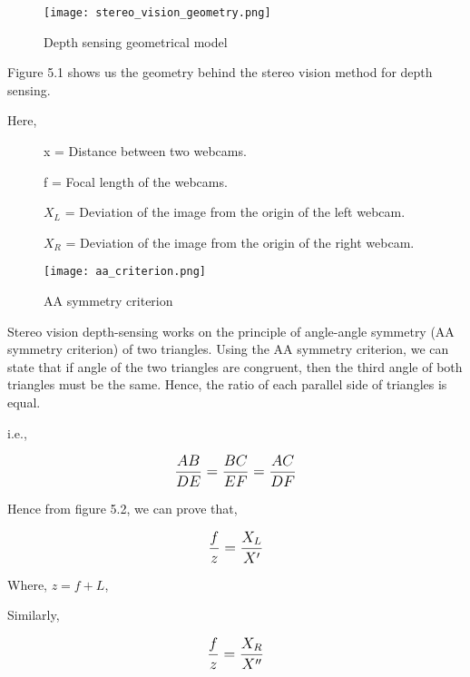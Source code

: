 \documentclass[../../hardware_design_intro/hardware_design_intro.tex]{subfiles}
\begin{document}
\FloatBarrier

\begin{figure}[ht]
    \centering
    \texttt{[image: stereo\_vision\_geometry.png]}
    \caption{Depth sensing geometrical model}
\end{figure}

\FloatBarrier

Figure 5.1 shows us the geometry behind the stereo vision method for depth sensing.

Here, 

\begin{description}
    \item[]x = Distance between two webcams. 
    \item[]f = Focal length of the webcams.
    \item[]\(X_{L}\) = Deviation of the image from the origin of the left webcam.
    \item[]\(X_{R}\) = Deviation of the image from the origin of the right webcam.  
\end{description}

\begin{figure}[ht]
    \centering
    \texttt{[image: aa\_criterion.png]}
    \caption{AA symmetry criterion}
\end{figure}

Stereo vision depth-sensing works on the principle of angle-angle symmetry (AA symmetry 
criterion) of two triangles. Using the AA symmetry criterion, we can state that if angle
of the two triangles are congruent, then the third angle of both triangles must be the 
same. Hence, the ratio of each parallel side of triangles is equal.

i.e.,

\begin{equation}
    \text{\large$ \frac{AB}{DE} = \frac{BC}{EF} = \frac{AC}{DF} $}
\end{equation}

Hence from figure 5.2, we can prove that,

\begin{equation}
    \text{\large$ \frac{f}{z} = \frac{X_{L}}{X'} $}
\end{equation}

Where, \(z = f + L \),

Similarly,

\begin{equation}
    \text{\large$ \frac{f}{z} = \frac{X_{R}}{X''} $}
\end{equation}
\end{document}

